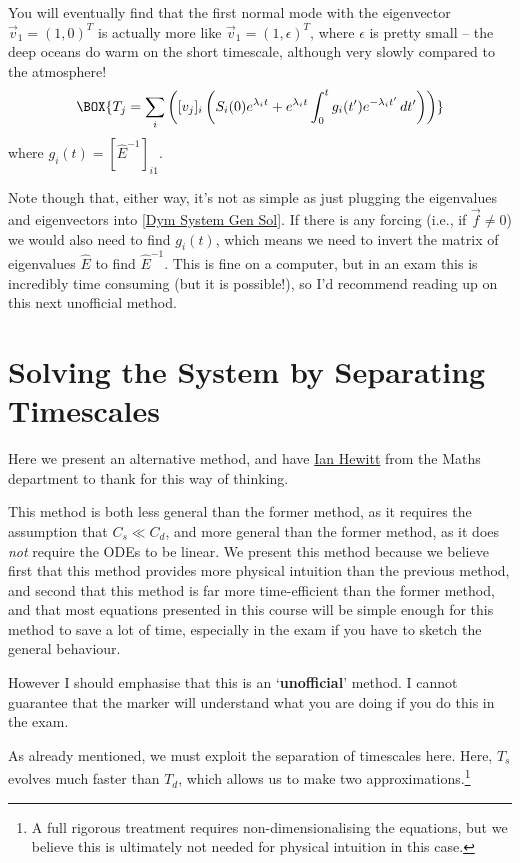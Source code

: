 You will eventually find that the first normal mode with the eigenvector $\vec{v}_1=(1,0)^T$ is actually more like $\vec{v}_1=(1,\epsilon)^T$, where $\epsilon$ is pretty small – the deep oceans do warm on the short timescale, although very slowly compared to the atmosphere!
\begin{align}
    \BOX{
        T_j=\sum_{i} \left( [v_j]_i \left( S_i(0)e^{\lambda_i t}+e^{\lambda_i t}\int_{0}^{t}g_i(t')e^{-\lambda_i t'}\,dt' \right) \right)
    }
\end{align}
where $g_i(t)=[\hat{E}^{-1}]_{i1}$.

Note though that, either way, it's not as simple as just plugging the eigenvalues and eigenvectors into \ref{Dym System Gen Sol}. If there is any forcing (i.e., if $\vec{f}\neq 0$) we would also need to find $g_i(t)$, which means we need to invert the matrix of eigenvalues $\hat{E}$ to find $\hat{E}^{-1}$. This is fine on a computer, but in an exam this is incredibly time consuming (but it is possible!), so I'd recommend reading up on this next unofficial method.

\section{Solving the System by Separating Timescales}\label{Hewitt Method}

Here we present an alternative method, and have \href{https://people.maths.ox.ac.uk/hewitt/}{Ian Hewitt} from the Maths department to thank for this way of thinking. 

This method is both less general than the former method, as it requires the assumption that $C_s\ll C_d$, and more general than the former method, as it does \textit{not} require the ODEs to be linear. We present this method because we believe first that this method provides more physical intuition than the previous method, and second that this method is far more time-efficient than the former method, and that most equations presented in this course will be simple enough for this method to save a lot of time, especially in the exam if you have to sketch the general behaviour.

However I should emphasise that this is an `\textbf{unofficial}' method. I cannot guarantee that the marker will understand what you are doing if you do this in the exam.

As already mentioned, we must exploit the separation of timescales here. Here, $T_s$ evolves much faster than $T_d$, which allows us to make two approximations.\footnote{A full rigorous treatment requires non-dimensionalising the equations, but we believe this is ultimately not needed for physical intuition in this case.}

